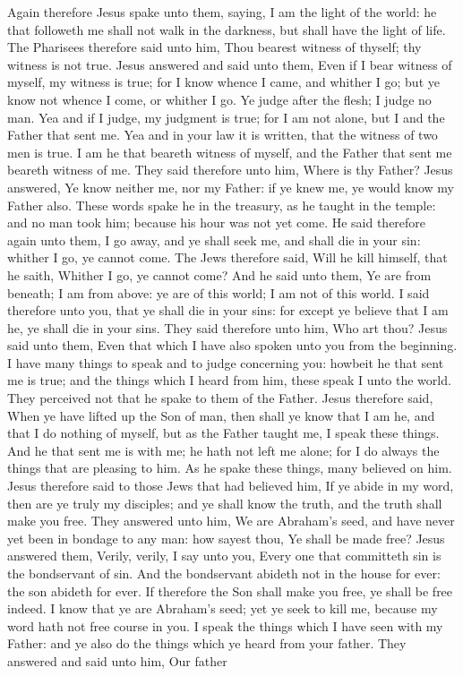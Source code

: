 Again therefore Jesus spake unto them, saying, I am the light of the world: he that followeth me shall not walk in the darkness, but shall have the light of life. The Pharisees therefore said unto him, Thou bearest witness of thyself; thy witness is not true. Jesus answered and said unto them, Even if I bear witness of myself, my witness is true; for I know whence I came, and whither I go; but ye know not whence I come, or whither I go. Ye judge after the flesh; I judge no man. Yea and if I judge, my judgment is true; for I am not alone, but I and the Father that sent me. Yea and in your law it is written, that the witness of two men is true. I am he that beareth witness of myself, and the Father that sent me beareth witness of me. They said therefore unto him, Where is thy Father? Jesus answered, Ye know neither me, nor my Father: if ye knew me, ye would know my Father also. These words spake he in the treasury, as he taught in the temple: and no man took him; because his hour was not yet come.  He said therefore again unto them, I go away, and ye shall seek me, and shall die in your sin: whither I go, ye cannot come. The Jews therefore said, Will he kill himself, that he saith, Whither I go, ye cannot come? And he said unto them, Ye are from beneath; I am from above: ye are of this world; I am not of this world. I said therefore unto you, that ye shall die in your sins: for except ye believe that I am he, ye shall die in your sins. They said therefore unto him, Who art thou? Jesus said unto them, Even that which I have also spoken unto you from the beginning. I have many things to speak and to judge concerning you: howbeit he that sent me is true; and the things which I heard from him, these speak I unto the world. They perceived not that he spake to them of the Father. Jesus therefore said, When ye have lifted up the Son of man, then shall ye know that I am he, and that I do nothing of myself, but as the Father taught me, I speak these things. And he that sent me is with me; he hath not left me alone; for I do always the things that are pleasing to him. As he spake these things, many believed on him.  Jesus therefore said to those Jews that had believed him, If ye abide in my word, then are ye truly my disciples; and ye shall know the truth, and the truth shall make you free. They answered unto him, We are Abraham’s seed, and have never yet been in bondage to any man: how sayest thou, Ye shall be made free? Jesus answered them, Verily, verily, I say unto you, Every one that committeth sin is the bondservant of sin. And the bondservant abideth not in the house for ever: the son abideth for ever. If therefore the Son shall make you free, ye shall be free indeed. I know that ye are Abraham’s seed; yet ye seek to kill me, because my word hath not free course in you. I speak the things which I have seen with my Father: and ye also do the things which ye heard from your father. They answered and said unto him, Our father 